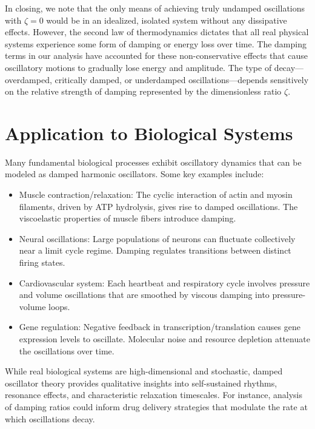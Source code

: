 In closing, we note that the only means of achieving truly undamped oscillations with $\zeta = 0$ would be in an idealized, isolated system without any dissipative effects. However, the second law of thermodynamics dictates that all real physical systems experience some form of damping or energy loss over time. The damping terms in our analysis have accounted for these non-conservative effects that cause oscillatory motions to gradually lose energy and amplitude. The type of decay---overdamped, critically damped, or underdamped oscillations---depends sensitively on the relative strength of damping represented by the dimensionless ratio $\zeta$.

\section{Application to Biological Systems}

Many fundamental biological processes exhibit oscillatory dynamics that can be modeled as damped harmonic oscillators. Some key examples include:

\begin{itemize}
\item Muscle contraction/relaxation: The cyclic interaction of actin and myosin filaments, driven by ATP hydrolysis, gives rise to damped oscillations. The viscoelastic properties of muscle fibers introduce damping.

\item Neural oscillations: Large populations of neurons can fluctuate collectively near a limit cycle regime. Damping regulates transitions between distinct firing states.

\item Cardiovascular system: Each heartbeat and respiratory cycle involves pressure and volume oscillations that are smoothed by viscous damping into pressure-volume loops.

\item Gene regulation: Negative feedback in transcription/translation causes gene expression levels to oscillate. Molecular noise and resource depletion attenuate the oscillations over time.
\end{itemize}

While real biological systems are high-dimensional and stochastic, damped oscillator theory provides qualitative insights into self-sustained rhythms, resonance effects, and characteristic relaxation timescales. For instance, analysis of damping ratios could inform drug delivery strategies that modulate the rate at which oscillations decay.

